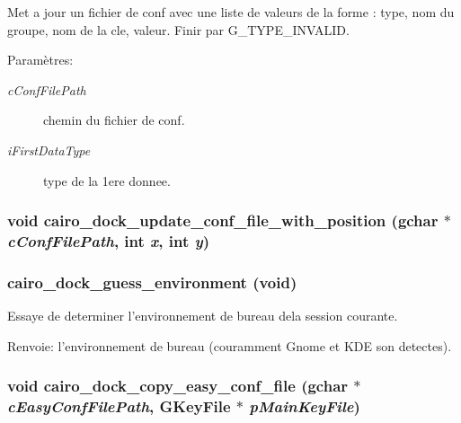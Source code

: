 Met a jour un fichier de conf avec une liste de valeurs de la forme : type, nom du groupe, nom de la cle, valeur. Finir par G\_\-TYPE\_\-INVALID. \begin{Desc}
\item[Paramètres:]
\begin{description}
\item[{\em cConfFilePath}]chemin du fichier de conf. \item[{\em iFirstDataType}]type de la 1ere donnee. \end{description}
\end{Desc}
\subsubsection{\setlength{\rightskip}{0pt plus 5cm}void cairo\_\-dock\_\-update\_\-conf\_\-file\_\-with\_\-position (gchar $\ast$ {\em cConfFilePath}, int {\em x}, int {\em y})}\label{cairo-dock-config_8h_4fbe55818645f3a7eababc1023ccb205}


\subsubsection{ cairo\_\-dock\_\-guess\_\-environment (void)}\label{cairo-dock-config_8h_e4f8b1a235338cc84135c147972d7ca1}


Essaye de determiner l'environnement de bureau dela session courante. \begin{Desc}
\item[Renvoie:]l'environnement de bureau (couramment Gnome et KDE son detectes). \end{Desc}
\subsubsection{\setlength{\rightskip}{0pt plus 5cm}void cairo\_\-dock\_\-copy\_\-easy\_\-conf\_\-file (gchar $\ast$ {\em cEasyConfFilePath}, GKeyFile $\ast$ {\em pMainKeyFile})}\label{cairo-dock-config_8h_99b1a5ec61008af612dd93c43a711d0e}


